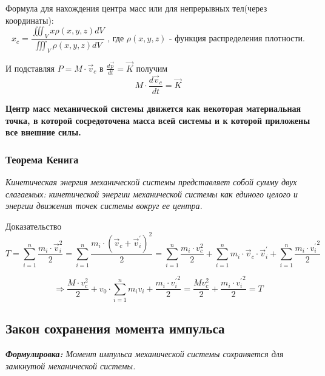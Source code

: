 \documentclass[12pt,a4paper]{report}
\begin{document}
\vspace{5px}

Формула для нахождения центра масс или для непрерывных тел(через координаты):
\[ x_c = \frac{\iiint_{V} x\rho(x, y, z) dV }{\iiint_{V} \rho(x, y, z) dV} \text{ , где $\rho(x, y, z)$ - функция распределения плотности.}\]

И подставляя $P = M \cdot \vec v_c$ в $\frac{d\vec p}{dt} = \vec K$ получим \[ M \cdot \frac{d \vec v_c}{dt} = \vec K \]

\textbf{Центр масс механической системы движется как некоторая материальная точка, в которой сосредоточена масса всей системы и к которой приложены все внешние силы.}

\subsubsection{Теорема Кенига}

\textit{Кинетическая энергия механической системы представляет собой сумму двух слагаемых: кинетической энергии механической системы как единого целого и энергии движения точек системы вокруг ее центра.}

\vspace{4px}

Доказательство
\[T = \sum_{i=1}^n \frac{m_i \cdot \vec v_i^2}{2} = \sum_{i=1}^n \frac{m_i \cdot (\vec v_c + \vec v_i^{\prime})^2}{2}  = \sum_{i=1}^n{\frac{m_i \cdot v_c^2}{2}} + \sum_{i=1}^n{m_i \cdot \vec v_c \cdot \vec v_i^{\prime}} + \sum_{i=1}^n{\frac{m_i \cdot {v_i^{\prime}}^2}{2}} \]

\[\Rightarrow \frac{M \cdot v_c^2}{2} + v_0 \cdot \sum_{i=1}^n m_i v_i + \frac{m_i \cdot {v_i^{\prime}}^2}{2} = \frac{Mv_c^2}{2} + \frac{m_i \cdot {v_i^{\prime}}^2}{2} = T\]
\subsection{Закон сохранения момента импульса}

\textit{\textbf{Формулировка:} Момент импульса механической системы сохраняется для замкнутой механической системы.}
\end{document}
